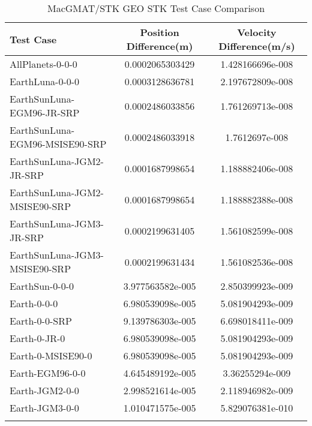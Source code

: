 \begin{table}[htbp!]
\centering
\caption{ MacGMAT/STK GEO STK Test Case Comparison}
      \begin{tabular}{lcc}
      \hline\hline
          Test Case & Position Difference(m) & Velocity Difference(m/s) \\
         \hline
         AllPlanets-0-0-0 & 0.0002065303429 & 1.428166696e-008 \\
         EarthLuna-0-0-0 & 0.0003128636781 & 2.197672809e-008 \\
         EarthSunLuna-EGM96-JR-SRP & 0.0002486033856 & 1.761269713e-008 \\
         EarthSunLuna-EGM96-MSISE90-SRP & 0.0002486033918 & 1.7612697e-008 \\
         EarthSunLuna-JGM2-JR-SRP & 0.0001687998654 & 1.188882406e-008 \\
         EarthSunLuna-JGM2-MSISE90-SRP & 0.0001687998654 & 1.188882388e-008 \\
         EarthSunLuna-JGM3-JR-SRP & 0.0002199631405 & 1.561082599e-008 \\
         EarthSunLuna-JGM3-MSISE90-SRP & 0.0002199631434 & 1.561082536e-008 \\
         EarthSun-0-0-0 & 3.977563582e-005 & 2.850399923e-009 \\
         Earth-0-0-0 & 6.980539098e-005 & 5.081904293e-009 \\
         Earth-0-0-SRP & 9.139786303e-005 & 6.698018411e-009 \\
         Earth-0-JR-0 & 6.980539098e-005 & 5.081904293e-009 \\
         Earth-0-MSISE90-0 & 6.980539098e-005 & 5.081904293e-009 \\
         Earth-EGM96-0-0 & 4.645489192e-005 & 3.36255294e-009 \\
         Earth-JGM2-0-0 & 2.998521614e-005 & 2.118946982e-009 \\
         Earth-JGM3-0-0 & 1.010471575e-005 & 5.829076381e-010 \\
      \hline\hline
      \label{Table: GEO STK Table} 
\end{tabular}
\end{table}
